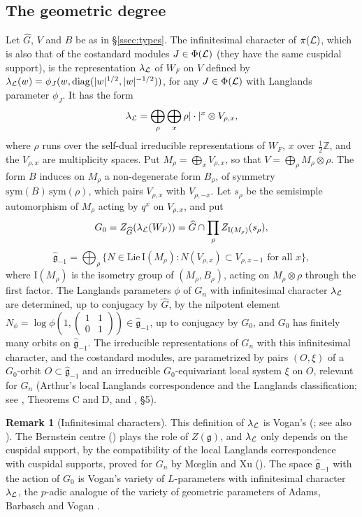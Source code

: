 \documentclass[a4paper,12pt,leqno]{amsart}
\theoremstyle{plain}
\theoremstyle{definition}
\newtheorem{rmk}[thm]{Remark}
\providecommand{\bbZ}{\mathbb{Z}}\providecommand{\bbC}{\mathbb{C}}\providecommand{\Id}{\mathrm{Id}}\providecommand{\Irr}{\mathbf{Irr}}\providecommand{\Alg}{\mathrm{Alg}}
\begin{document}
\subsection{The geometric degree}\label{sec:geom}
Let $\widehat G$, $V$ and $B$ be as in \S\ref{ssec:types}. The infinitesimal character of $\pi(\mathcal{L})$,
which is also that of the costandard modules $J\in\Phi(\mathcal{L})$ (they have the same cuspidal support), is
the representation $\lambda_{\mathcal{L}}$ of $W_F$ on $V$ defined by
$\lambda_{\mathcal{L}}(w)=\phi_J(w,\mathrm{diag}(|w|^{1/2},|w|^{-1/2}))$, for any $J\in\Phi(\mathcal{L})$ with Langlands
parameter $\phi_J$. It has the form
\[\lambda_{\mathcal{L}}=\bigoplus_\rho\bigoplus_{x}\rho|\cdot|^x\otimes V_{\rho,x},\]
where $\rho$ runs over the self-dual irreducible representations of $W_F$, $x$ over $\frac12\bbZ$, and the
$V_{\rho,x}$ are multiplicity spaces. Put $M_\rho=\bigoplus_xV_{\rho,x}$, so that $V=\bigoplus_\rho M_\rho
\otimes\rho$. The form $B$ induces on $M_\rho$ a non-degenerate form $B_\rho$, of symmetry
$\mathrm{sym}(B)\,\mathrm{sym}(\rho)$, which pairs $V_{\rho,x}$ with $V_{\rho,-x}$. Let $s_\rho$ be the
semisimple automorphism of $M_\rho$ acting by $q^x$ on $V_{\rho,x}$, and put
\[G_0=Z_{\widehat G}(\lambda_{\mathcal{L}}(W_F))=\widehat G\cap\prod_\rho Z_{\mathrm{I}(M_\rho)}(s_\rho),\]
\[\widehat{\mathfrak g}_{-1}=\bigoplus_\rho\{N\in\mathrm{Lie}\,\mathrm{I}(M_\rho):N(V_{\rho,x})\subset
V_{\rho,x-1}\text{ for all }x\},\]
where $\mathrm{I}(M_\rho)$ is the isometry group of $(M_\rho,B_\rho)$, acting on $M_\rho\otimes\rho$ through
the first factor. The Langlands parameters $\phi$ of $G_n$ with infinitesimal character $\lambda_{\mathcal{L}}$
are determined, up to conjugacy by $\widehat G$, by the nilpotent element
$N_\phi=\log\phi(1,\left(\begin{smallmatrix}1&1\\0&1\end{smallmatrix}\right))\in\widehat{\mathfrak g}_{-1}$, up to
conjugacy by $G_0$, and $G_0$ has finitely many orbits on $\widehat{\mathfrak g}_{-1}$. The irreducible
representations of $G_n$ with this infinitesimal character, and the costandard modules, are
parametrized by pairs $(O,\xi)$ of a $G_0$-orbit $O\subset\widehat{\mathfrak g}_{-1}$ and an irreducible
$G_0$-equivariant local system $\xi$ on $O$, relevant for $G_n$ (Arthur's local Langlands correspondence \cite{Art13} and
the Langlands classification; see \cite{AMS22}, Theorems C and D, and \cite{Sol25}, \S5).

\begin{rmk}[Infinitesimal characters]\label{rmk:infchar} This definition of $\lambda_{\mathcal{L}}$ is Vogan's
(\cite{Vog93}; see also \cite{Hai14}). The Bernstein centre (\cite{BD84}) plays the role of
$Z(\mathfrak g)$, and $\lambda_{\mathcal{L}}$ only depends on the cuspidal support, by the compatibility of the
local Langlands correspondence with cuspidal supports, proved for $G_n$ by M\oe glin and Xu
(\cite{Xu17}). The space $\widehat{\mathfrak g}_{-1}$ with the action of $G_0$ is Vogan's variety of
$L$-parameters with infinitesimal character $\lambda_{\mathcal{L}}$, the $p$-adic analogue of the variety of
geometric parameters of Adams, Barbasch and Vogan \cite{ABV92}.
\end{rmk}
\end{document}
